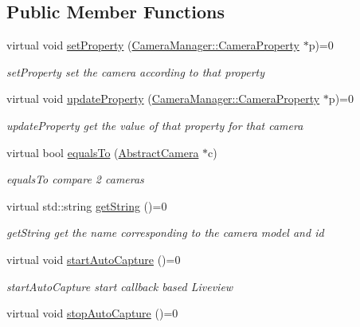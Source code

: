 \subsection*{Public Member Functions}
\begin{DoxyCompactItemize}
\item 
virtual void \hyperlink{class_abstract_camera_a8b50d3e4925cfe74ed383376ba02bb5e}{set\-Property} (\hyperlink{class_camera_manager_1_1_camera_property}{Camera\-Manager\-::\-Camera\-Property} $\ast$p)=0
\begin{DoxyCompactList}\small\item\em set\-Property set the camera according to that property \end{DoxyCompactList}\item 
virtual void \hyperlink{class_abstract_camera_acb48ab701cd02e78604a3ca1c695b1cf}{update\-Property} (\hyperlink{class_camera_manager_1_1_camera_property}{Camera\-Manager\-::\-Camera\-Property} $\ast$p)=0
\begin{DoxyCompactList}\small\item\em update\-Property get the value of that property for that camera \end{DoxyCompactList}\item 
virtual bool \hyperlink{class_abstract_camera_a244917ab081c18caf389473847871dd6}{equals\-To} (\hyperlink{class_abstract_camera}{Abstract\-Camera} $\ast$c)
\begin{DoxyCompactList}\small\item\em equals\-To compare 2 cameras \end{DoxyCompactList}\item 
virtual std\-::string \hyperlink{class_abstract_camera_a75dc6b53d5a8717944d5e8ded9609611}{get\-String} ()=0
\begin{DoxyCompactList}\small\item\em get\-String get the name corresponding to the camera model and id \end{DoxyCompactList}\item 
\hypertarget{class_abstract_camera_a2f47d9877c5308856f42c94723faca33}{virtual void \hyperlink{class_abstract_camera_a2f47d9877c5308856f42c94723faca33}{start\-Auto\-Capture} ()=0}\label{class_abstract_camera_a2f47d9877c5308856f42c94723faca33}

\begin{DoxyCompactList}\small\item\em start\-Auto\-Capture start callback based Liveview \end{DoxyCompactList}\item 
\hypertarget{class_abstract_camera_a08bd5e2c3f8a92187f36e1f6322eccb5}{virtual void \hyperlink{class_abstract_camera_a08bd5e2c3f8a92187f36e1f6322eccb5}{stop\-Auto\-Capture} ()=0}\label{class_abstract_camera_a08bd5e2c3f8a92187f36e1f6322eccb5}


\end{DoxyCompactItemize}
